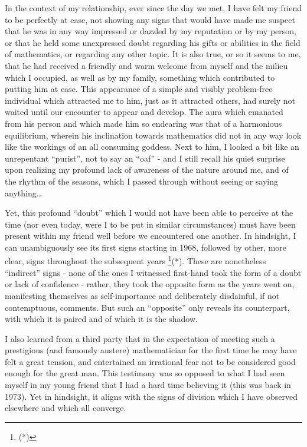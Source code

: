 In the context of my relationship, ever since the day we met, I have felt my friend to be
perfectly at ease, not showing any signs that would have made me suspect that he was in
any way impressed or dazzled by my reputation or by my person, or that he held some
unexpressed doubt regarding his gifts or abilities
in the field of mathematics, or regarding any other topic. 
It is also true, or so it seems to me,  that he had received a friendly and warm welcome
from myself and the milieu which I occupied, as well as by my family, 
something which contributed to putting him at ease.
This appearance of a simple and visibly problem-free individual which attracted me to him,
just as it attracted others, had surely not waited until our encounter to appear and
develop. The aura which emanated from his person and which made him so endearing was that
of a harmonious equilibrium, wherein his inclination towards mathematics did not in any
way look like the workings of an all consuming goddess.
Next to him, I looked a bit like an unrepentant ``purist'', not to say an ``oaf''
- and I still recall his quiet surprise upon realizing my profound lack of awareness of
the nature around me, and of the rhythm of the seasons, which I passed through without
seeing or saying anything\ldots 

Yet, this profound ``doubt'' which I would not have been able to perceive at the time (nor
even today, were I to be put in similar circumstances) must have been present within my
friend well before we encountered one another.
In hindsight, I can unambiguously see its first signs starting in 1968, 
followed by other, more clear, signs throughout the subsequent years
\footnote{(*)}(*).
These are nonetheless ``indirect'' signs - none of the ones I witnessed first-hand took
the form of  a doubt or lack of confidence - 
rather, they took the opposite form as the years went on, manifesting themselves 
as self-importance and deliberately disdainful, if not contemptuous,
comments.
But such an ``opposite'' only reveals its counterpart,
with which it is paired and of which it is the shadow.

I also learned from a third party that 
in the expectation 
of meeting such a prestigious (and famously austere)
mathematician for the first time
he may have felt a great tension, and entertained an irrational fear not to be considered
good enough for the great man.
This testimony was so opposed to what I had seen myself in my young friend that I had a
hard time believing it (this was back in 1973).
Yet in hindsight, it aligns with the signs of division which I have observed 
elsewhere and which all converge.

